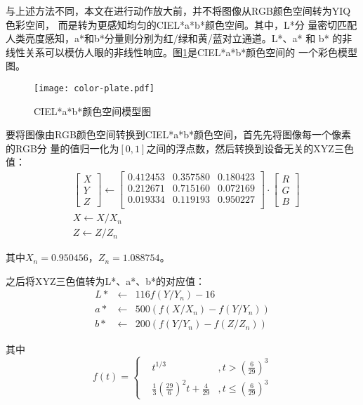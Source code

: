 与上述方法不同，本文在进行动作放大前，并不将图像从RGB颜色空间转为YIQ色彩空间，
而是转为更感知均匀的CIEL*a*b*颜色空间。其中，L*分
量密切匹配人类亮度感知，a*和b*分量则分别为红/绿和黄/蓝对立通道。L*、a* 和 b*
的非线性关系可以模仿人眼的非线性响应。图\ref{fig:cielab}是CIEL*a*b*颜色空间的
一个彩色模型图。

\begin{figure}[htbp]
  \centering
  \texttt{[image: color-plate.pdf]}
  \caption{CIEL*a*b*颜色空间模型图}
  \label{fig:cielab}
\end{figure}

要将图像由RGB颜色空间转换到CIEL*a*b*颜色空间，首先先将图像每一个像素的RGB分
量的值归一化为$[0, 1]$之间的浮点数，然后转换到设备无关的XYZ三色值：
\begin{eqnarray*}
  & \begin{bmatrix} X \\ Y \\ Z \end{bmatrix} \leftarrow
  \begin{bmatrix}
    0.412453 & 0.357580 & 0.180423 \\
    0.212671 & 0.715160 & 0.072169 \\
    0.019334 & 0.119193 & 0.950227 \\
  \end{bmatrix}
  \cdot
  \begin{bmatrix}
    R \\ G \\ B
  \end{bmatrix}\\
  & X \leftarrow X/X_n\\
  & Z \leftarrow Z/Z_n
\end{eqnarray*}

其中$X_n = 0.950456$，$Z_n = 1.088754$。

之后将XYZ三色值转为L*、a*、b*的对应值：
\begin{eqnarray*}
  L* & \leftarrow & 116f(Y/Y_n)-16\\
  a* & \leftarrow & 500(f(X/X_n)-f(Y/Y_n))\\
  b* & \leftarrow & 200(f(Y/Y_n)-f(Z/Z_n))
\end{eqnarray*}

其中
\begin{displaymath}
  f(t)=\left\{
    \begin{aligned}
      & t^{1/3} &, t > (\frac{6}{29})^3\\
      & \frac{1}{3}(\frac{29}{6})^2t + \frac{4}{29} &, t \le (\frac{6}{29})^3
    \end{aligned}
\right.
\end{displaymath}

